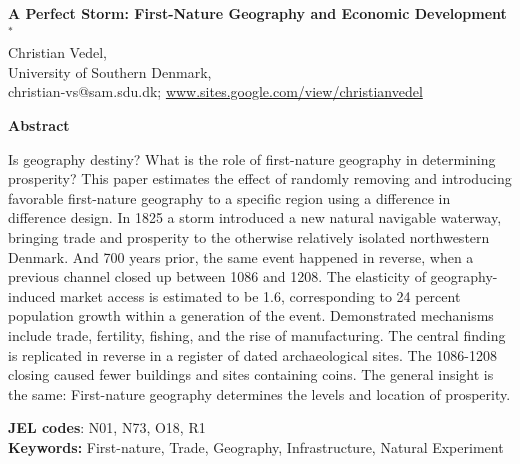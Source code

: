 \documentclass[11pt]{article}
\begin{document}
\begin{titlepage}

    \begin{center}
        \LARGE
        \textbf{A Perfect Storm: First-Nature Geography and Economic Development$^*$} \\
        
        \vspace{0.5cm}
        \large
        Christian Vedel, \\ University of Southern Denmark,\\
        \small
        \vspace{0.25cm}
        christian-vs@sam.sdu.dk; 
        \url{www.sites.google.com/view/christianvedel} 
        
        \vspace{0.75cm}
    
        \large
        \textbf{Abstract} \\     
    \end{center}

   
    \normalsize
    \begin{changemargin}{1cm}{1cm}
    Is geography destiny? What is the role of first-nature geography in determining prosperity? This paper estimates the effect of randomly removing and introducing favorable first-nature geography to a specific region using a difference in difference design. In 1825 a storm introduced a new natural navigable waterway, bringing trade and prosperity to the otherwise relatively isolated northwestern Denmark. And 700 years prior, the same event happened in reverse, when a previous channel closed up between 1086 and 1208. The elasticity of geography-induced market access is estimated to be 1.6, corresponding to 24 percent population growth within a generation of the event. Demonstrated mechanisms include trade, fertility, fishing, and the rise of manufacturing. The central finding is replicated in reverse in a register of dated archaeological sites. The 1086-1208 closing caused fewer buildings and sites containing coins. The general insight is the same: First-nature geography determines the levels and location of prosperity.
    
    \vspace{0.05cm} 
    \textbf{JEL codes}: N01, N73, O18, R1 \\
    \textbf{Keywords:} First-nature, Trade, Geography, Infrastructure, Natural Experiment
    \end{changemargin}


\end{titlepage}
\end{document}
